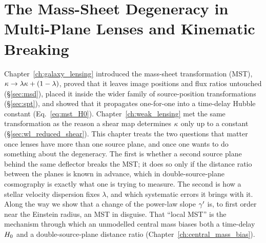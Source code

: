 
\chapter{The Mass-Sheet Degeneracy in Multi-Plane Lenses and Kinematic Breaking}
\label{ch:msd_kinematics}

\noindent
Chapter~\ref{ch:galaxy_lensing} introduced the mass-sheet transformation
(MST), $\kappa\to\lambda\kappa+(1-\lambda)$, proved that it leaves image
positions and flux ratios untouched (\S\ref{sec:msd}), placed it inside the
wider family of source-position transformations (\S\ref{sec:spt}), and showed
that it propagates one-for-one into a time-delay Hubble constant
(Eq.~\ref{eq:mst_H0}).  Chapter~\ref{ch:weak_lensing} met the same
transformation as the reason a shear map determines $\kappa$ only up to a
constant (\S\ref{sec:wl_reduced_shear}).  This chapter treats the two
questions that matter once lenses have more than one source plane, and once
one wants to do something about the degeneracy.  The first is whether a second
source plane behind the same deflector breaks the MST; it does so only if the
distance ratio between the planes is known in advance, which in
double-source-plane cosmography is exactly what one is trying to measure.  The
second is how a stellar velocity dispersion fixes $\lambda$, and which
systematic errors it brings with it.
Along the way we show that a change of the power-law slope $\gamma'$ is, to first
order near the Einstein radius, an MST in disguise.  That ``local MST'' is the
mechanism through which an unmodelled central mass biases both a time-delay
$H_0$ and a double-source-plane distance ratio
(Chapter~\ref{ch:central_mass_bias}).

